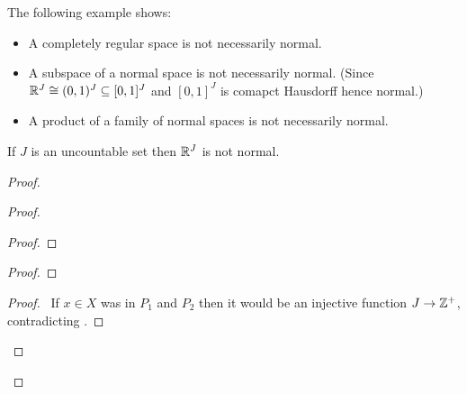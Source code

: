 The following example shows:
\begin{itemize}
    \item A completely regular space is not necessarily normal.
    \item A subspace of a normal space is not necessarily normal.
    (Since $\mathbb{R}^J \cong (0,1)^J \subseteq [0,1]^J$ and $[0,1]^J$
    is comapct Hausdorff hence normal.)
    \item A product of a family of normal spaces is not necessarily normal.
\end{itemize}

\begin{example}[Choice]
    If $J$ is an uncountable set then $\mathbb{R}^J$ is not normal.
\end{example}

\begin{proof}
    \pf
    \begin{proof}
        \begin{proof}
        \end{proof}
        \begin{proof}
        \end{proof}
        \begin{proof}
            \pf\ If $x \in X$ was in $P_1$ and $P_2$ then it would be an injective
            function $J \rightarrow \mathbb{Z}^+$, contradicting .
        \end{proof}
\end{proof}
\end{proof}
